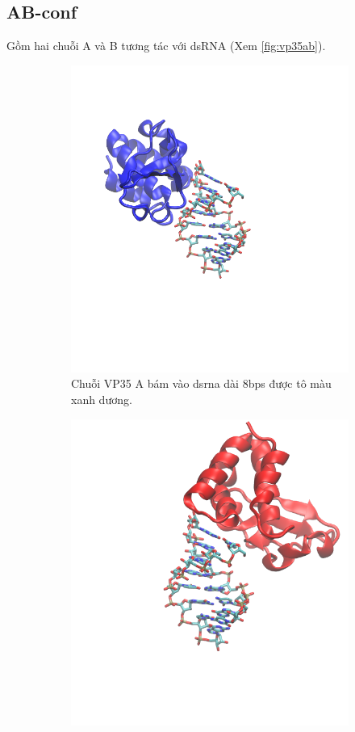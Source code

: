 \documentclass[12pt,a4paper,reqno, oneside]{book}
\begin{document}
	\subsection{AB-conf}
	\hspace{18pt}
		Gồm hai chuỗi A và B tương tác với dsRNA (Xem \ref{fig:vp35ab}).
		\begin{figure}[p]
		\begin{subfigure}[h]{0.5\textwidth}
		\includegraphics[width=0.9\linewidth,natwidth=610,natheight=642]{VP35_A.png}
		\vspace{-40pt}
		\caption{Chuỗi VP35 A bám vào \gls{dsrna} dài 8bps được tô màu xanh dương.}
		\label{fig:vp35a}
		\end{subfigure}
		\begin{subfigure}[h]{0.5\textwidth}
		\includegraphics[width=0.9\linewidth,natwidth=610,natheight=642]{VP35_B.png}

\end{subfigure}
\end{figure}
\end{document}
